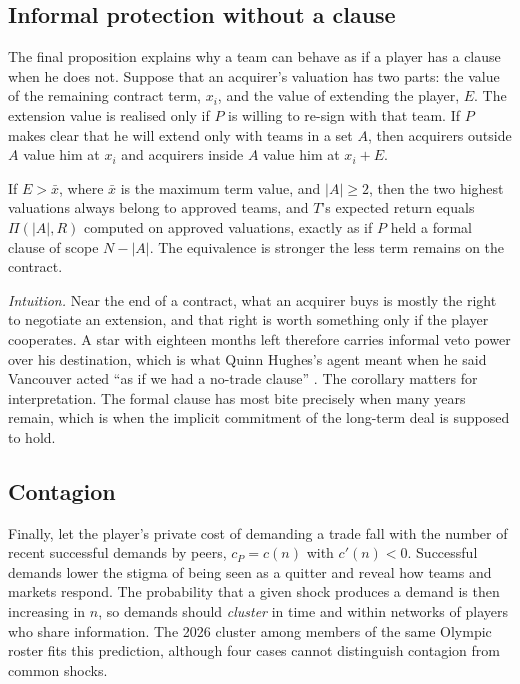 \subsection{Informal protection without a clause}

The final proposition explains why a team can behave as if a player has a clause when he does not. Suppose that an acquirer's valuation has two parts: the value of the remaining contract term, $x_i$, and the value of extending the player, $E$. The extension value is realised only if $P$ is willing to re-sign with that team. If $P$ makes clear that he will extend only with teams in a set $A$, then acquirers outside $A$ value him at $x_i$ and acquirers inside $A$ value him at $x_i+E$.

\begin{proposition}\label{prop:informal}
If $E>\bar x$, where $\bar x$ is the maximum term value, and $|A|\ge2$, then the two highest valuations always belong to approved teams, and $T$'s expected return equals $\Pi(|A|,R)$ computed on approved valuations, exactly as if $P$ held a formal clause of scope $N-|A|$. The equivalence is stronger the less term remains on the contract.
\end{proposition}

\noindent\emph{Intuition.} Near the end of a contract, what an acquirer buys is mostly the right to negotiate an extension, and that right is worth something only if the player cooperates. A star with eighteen months left therefore carries informal veto power over his destination, which is what Quinn Hughes's agent meant when he said Vancouver acted ``as if we had a no-trade clause'' \citep{dailyhive_hughes}. The corollary matters for interpretation. The formal clause has most bite precisely when many years remain, which is when the implicit commitment of the long-term deal is supposed to hold.

\subsection{Contagion}

Finally, let the player's private cost of demanding a trade fall with the number of recent successful demands by peers, $c_P = c(n)$ with $c'(n)<0$. Successful demands lower the stigma of being seen as a quitter and reveal how teams and markets respond. The probability that a given shock produces a demand is then increasing in $n$, so demands should \emph{cluster} in time and within networks of players who share information. The 2026 cluster among members of the same Olympic roster fits this prediction, although four cases cannot distinguish contagion from common shocks.

